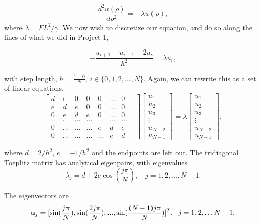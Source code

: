 \documentclass[a4paper]{article}
\begin{document}
\begin{equation}
\frac{d^2 u(\rho)}{d\rho^2}  = -\lambda u(\rho),
\end{equation}
where $\lambda = FL^2/\gamma$. We now wish to discretize our equation, and do so along the lines of what we did in Project 1,


\begin{equation}
-\frac{u_{i+1} + u_{i-1} -2u_i}{h^2} = \lambda u_i,
\end{equation}

with step length, $h = \frac{1-0}{N}$,  $i \in \{0,1,2, ..., N\}$.  Again, we can rewrite this as a set of linear equations,
\begin{equation}\label{eq: matrix}
\begin{bmatrix}
d & e & 0 & 0 & 0 & \dots & 0\\
e & d & e & 0 & 0 & \dots & 0\\
0 & e & d & e & 0 & \dots & 0\\
\dots & \dots & \dots & \dots & \dots & \dots & \dots &\\
0 & \dots & \dots & \dots & e & d & e\\
0 & \dots & \dots & \dots & \dots & e & d
\end{bmatrix}
\begin{bmatrix}
u_1\\
u_2\\
u_3\\
\vdots\\
u_{N-2}\\
u_{N-1}
\end{bmatrix}
 =
 \lambda
 \begin{bmatrix}
u_1\\
u_2\\
u_3\\
\vdots\\
u_{N-2}\\
u_{N-1}
\end{bmatrix},
\end{equation}

where $d = 2/h^2$, $e = -1/h^2$ and the endpoints are left out. The  tridiagonal Toeplitz matrix has analytical eigenpairs, with eigenvalues
\begin{equation}\label{eq: anal eigenvals}
\lambda_j = d + 2e\cos\left(\frac{j\pi}{N}\right), \quad j = 1, 2, ..., N-1.
\end{equation}

The eigenvectors are 
\[
\mathbf{u}_j = [ \sin(\frac{j\pi}{N}), \sin(\frac{2j\pi}{N}), ..., \sin(\frac{(N-1)j\pi}{N}) ]^T, \hspace{0.2cm} j=1,2,\dots N-1.
\]
\end{document}
